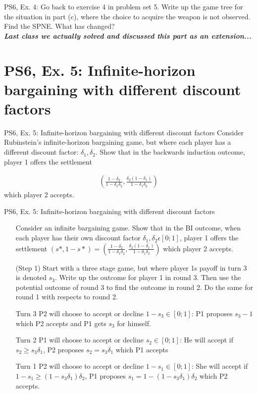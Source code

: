 \begin{frame}{PS6, Ex. 4: }
    Go back to exercise 4 in problem set 5. Write up the game tree for the situation in part (c), where the choice to acquire the weapon is not observed. Find the SPNE. What has changed?\\\bigskip
    \textbf{\textit{Last class we actually solved and discussed this part as an extension...}}
\end{frame}



\section{PS6, Ex. 5: Infinite-horizon bargaining with different discount factors}

\begin{frame}{PS6, Ex. 5: Infinite-horizon bargaining with different discount factors}
Consider Rubinstein's infinite-horizon bargaining game, but where each player has a different discount factor: $\delta_1,\delta_2$. Show that in the backwards induction outcome, player 1 offers the settlement

\begin{align}
    \left( \frac{1-\delta_2}{1-\delta_1\delta_2},\frac{\delta_2(1-\delta_1)}{1-\delta_1\delta_2}\right)
\end{align}
which player 2 accepts.
     \vfill\null
\end{frame}

\begin{frame}{PS6, Ex. 5: Infinite-horizon bargaining with different discount factors}
    \begin{itemize}
    \item[] Consider an infinite bargaining game. Show that in the BI outcome, when each player has their own discount factor $\delta_1,\delta_2 \epsilon [0;1]$, player 1 offers the settlement $ (s*,1-s*)= \left( \frac{1-\delta_2}{1-\delta_1\delta_2},\frac{\delta_2(1-\delta_1)}{1-\delta_1\delta_2}\right)$ which player 2 accepts.
    \item[(Step 1)] Start with a three stage game, but where player 1s payoff in turn 3 is denoted $s_3$. Write up the outcome for player 1 in round 3. Then use the potential outcome of round 3 to find the outcome in round 2. Do the same for round 1 with respects to round 2.
    \end{itemize}
    \vfill\null
    \begin{itemize}
        \item[Turn 3] P2 will choose to accept or decline $1-s_3\in [0;1]$: P1 proposes $s_3-1$ which P2 accepts and P1 gets $s_3$ for himself.
        \item[Turn 2] P1 will choose to accept or decline $s_2 \in [0;1]$: He will accept if $s_2 \geq s_3\delta_1$, P2 proposes $s_2 = s_3\delta_1$ which P1 accepts
        \item[Turn 1] P2 will choose to accept or decline $1-s_1 \in [0;1]$: She will accept if $1-s_1 \geq (1-s_3\delta_1)\delta_2$, P1 proposes $s_1 = 1- (1-s_3\delta_1)\delta_2$ which P2 accepts.
    \end{itemize}
     \vfill\null
\end{frame}


